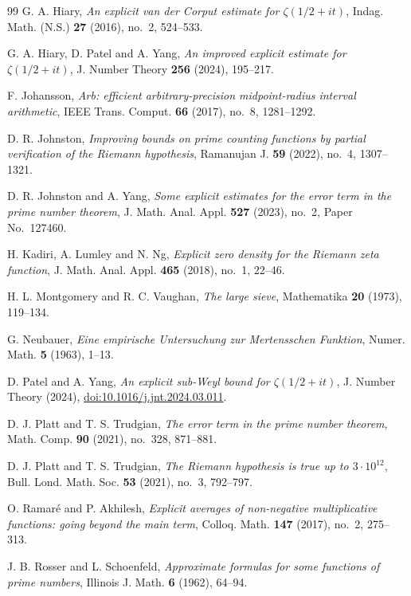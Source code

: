 \documentclass[11pt]{amsart}
\numberwithin{equation}{section}
\theoremstyle{definition}
\theoremstyle{remark}
\newcommand{\doi}[1]{\href{https://doi.org/#1}{doi:#1}}
\begin{document}
\begin{thebibliography}{99}
 G. A. Hiary, \emph{An explicit van der Corput estimate for $\zeta(1/2+it)$}, Indag. Math. (N.S.) \textbf{27} (2016), no.~2, 524--533.

 G. A. Hiary, D. Patel and A. Yang, \emph{An improved explicit estimate for $\zeta(1/2+it)$}, J. Number Theory \textbf{256} (2024), 195--217.

 F. Johansson, \emph{Arb: efficient arbitrary-precision midpoint-radius interval arithmetic}, IEEE Trans. Comput. \textbf{66} (2017), no.~8, 1281--1292.

 D. R. Johnston, \emph{Improving bounds on prime counting functions by partial verification of the Riemann hypothesis}, Ramanujan J. \textbf{59} (2022), no.~4, 1307--1321.

 D. R. Johnston and A. Yang, \emph{Some explicit estimates for the error term in the prime number theorem}, J. Math. Anal. Appl. \textbf{527} (2023), no.~2, Paper No.~127460.

 H. Kadiri, A. Lumley and N. Ng, \emph{Explicit zero density for the Riemann zeta function}, J. Math. Anal. Appl. \textbf{465} (2018), no.~1, 22--46.

 H. L. Montgomery and R. C. Vaughan, \emph{The large sieve}, Mathematika \textbf{20} (1973), 119--134.

 G. Neubauer, \emph{Eine empirische Untersuchung zur Mertensschen Funktion}, Numer. Math. \textbf{5} (1963), 1--13.

 D. Patel and A. Yang, \emph{An explicit sub-Weyl bound for $\zeta(1/2+it)$}, J. Number Theory (2024), \doi{10.1016/j.jnt.2024.03.011}.

 D. J. Platt and T. S. Trudgian, \emph{The error term in the prime number theorem}, Math. Comp. \textbf{90} (2021), no.~328, 871--881.

 D. J. Platt and T. S. Trudgian, \emph{The Riemann hypothesis is true up to $3\cdot10^{12}$}, Bull. Lond. Math. Soc. \textbf{53} (2021), no.~3, 792--797.

 O. Ramar\'e and P. Akhilesh, \emph{Explicit averages of non-negative multiplicative functions: going beyond the main term}, Colloq. Math. \textbf{147} (2017), no.~2, 275--313.

 J. B. Rosser and L. Schoenfeld, \emph{Approximate formulas for some functions of prime numbers}, Illinois J. Math. \textbf{6} (1962), 64--94.

\end{thebibliography}
\end{document}
